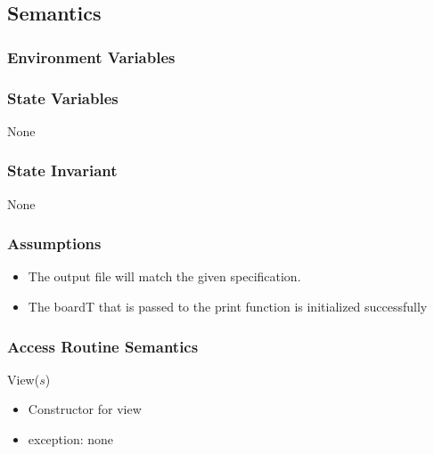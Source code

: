 \documentclass[12pt]{article}
\begin{document}
\subsection* {Semantics}

\subsubsection* {Environment Variables}

\subsubsection* {State Variables}

None

\subsubsection* {State Invariant}

None

\subsubsection* {Assumptions}

\begin{itemize}

\item The output file will match the given specification.

\item The boardT that is passed to the print function is initialized successfully


\end{itemize}



\subsubsection* {Access Routine Semantics}

\noindent View($s$)
\begin{itemize}
\item Constructor for view

\item exception: none
\end{itemize}
\end{document}
